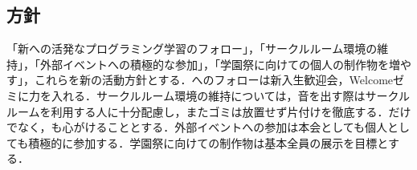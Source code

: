 \subsection*{\newGradeIfKouki{}\secondGrade{}方針}
「新\firstGrade{}への活発なプログラミング学習のフォロー」，「サークルルーム環境の維持」，「外部イベントへの積極的な参加」，「学園祭に向けての個人の制作物を増やす」，これらを新\secondGrade{}の活動方針とする．\firstGrade{}へのフォローは新入生歓迎会，Welcomeゼミに力を入れる．サークルルーム環境の維持については，音を出す際はサークルルームを利用する人に十分配慮し，またゴミは放置せず片付けを徹底する．\soumuStaff{}だけでなく，\secondGrade{}も心がけることとする．外部イベントへの参加は本会としても個人としても積極的に参加する．学園祭に向けての制作物は基本全員の展示を目標とする．

